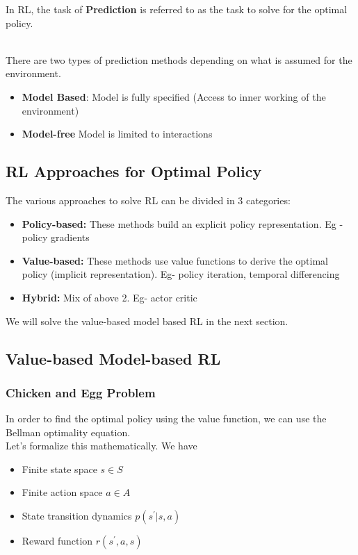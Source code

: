 \documentclass[11pt]{article}
\begin{document}
In RL, the task of \textbf{Prediction} is referred to as the task to solve for the optimal policy.

\\ 
There are two types of prediction methods depending on what is assumed for the environment.

\begin{itemize}
    \item \textbf{Model Based}: Model is fully specified (Access to inner working of the environment)
    \item \textbf{Model-free} Model is limited to interactions
\end{itemize}
\subsection{RL Approaches for Optimal Policy}
The various approaches to solve RL can be divided in 3 categories:
\begin{itemize}
    \item \textbf{Policy-based:} These methods build an explicit policy representation. Eg - policy gradients  
    \item \textbf{Value-based:} These methods use value functions to derive the optimal policy (implicit representation). Eg- policy iteration, temporal differencing 
    \item \textbf{Hybrid:} Mix of above 2. Eg- actor critic
\end{itemize}
We will solve the value-based model based RL in the next section.
\newpage
\subsection{Value-based Model-based RL}
\subsubsection{Chicken and Egg Problem}
In order to find the optimal policy using the value function, we can use the Bellman optimality equation. \\ Let's formalize this mathematically. We have 
\begin{itemize}
    \item Finite state space $s \in S$
    \item Finite action space $a \in A$
    \item State transition dynamics $p(s^{'}|s,a)$
    \item Reward function $r(s^{'},a,s)$
\end{itemize}
\end{document}
